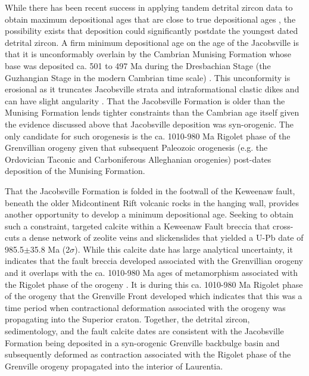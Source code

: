 While there has been recent success in applying tandem detrital zircon data to obtain maximum depositional ages that are close to true depositional ages \citep{Karlstrom2020a}, the possibility exists that deposition could significantly postdate the youngest dated detrital zircon. A firm minimum depositional age on the age of the Jacobsville is that it is unconformably overlain by the Cambrian Munising Formation whose base was deposited ca. 501 to 497 Ma during the Dresbachian Stage (the Guzhangian Stage in the modern Cambrian time scale) \citep{Hamblin1958a, Haddox1990a}. This unconformity is erosional as it truncates Jacobsville strata and intraformational clastic dikes and can have slight angularity \citep{Hamblin1958a, Haddox1990a}. That the Jacobsville Formation is older than the Munising Formation lends tighter constraints than the Cambrian age itself given the evidence discussed above that Jacobsville deposition was syn-orogenic. The only candidate for such orogenesis is the ca. 1010-980 Ma Rigolet phase of the Grenvillian orogeny given that subsequent Paleozoic orogenesis (e.g. the Ordovician Taconic and Carboniferous Alleghanian orogenies) post-dates deposition of the Munising Formation.

That the Jacobsville Formation is folded in the footwall of the Keweenaw fault, beneath the older Midcontinent Rift volcanic rocks in the hanging wall, provides another opportunity to develop a minimum depositional age. Seeking to obtain such a constraint, \cite{Hodgin2022a} targeted calcite within a Keweenaw Fault breccia that cross-cuts a dense network of zeolite veins and slickenslides that yielded a U-Pb date of 985.5$\pm$35.8 Ma (2$\sigma$). While this calcite date has large analytical uncertainty, it indicates that the fault breccia developed associated with the Grenvillian orogeny and it overlaps with the ca. 1010-980 Ma ages of metamorphism associated with the Rigolet phase of the orogeny \citep{Swanson-Hysell2023a}. It is during this ca. 1010-980 Ma Rigolet phase of the orogeny that the Grenville Front developed \citep{Rivers2008a} which indicates that this was a time period when contractional deformation associated with the orogeny was propagating into the Superior craton. Together, the detrital zircon, sedimentology, and the fault calcite dates are consistent with the Jacobsville Formation being deposited in a syn-orogenic Grenville backbulge basin and subsequently deformed as contraction associated with the Rigolet phase of the Grenville orogeny propagated into the interior of Laurentia. 

